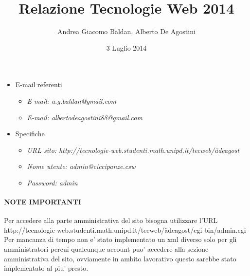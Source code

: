 \documentclass[a4paper, 12pt]{article}
\title{Relazione Tecnologie Web 2014}
\author{Andrea Giacomo Baldan, Alberto De Agostini}
\date{3 Luglio 2014}
\begin{document}
\maketitle

\begin{itemize}
\item E-mail referenti
  \begin{itemize}
  \item \emph{E-mail: a.g.baldan@gmail.com}
  \item \emph{E-mail: albertodeagostini88@gmail.com}
  \end{itemize}
\item Specifiche
  \begin{itemize}
  \item \emph{URL sito: http://tecnologie-web.studenti.math.unipd.it/tecweb/\~adeagost}
  \item \emph{Nome utente: admin@ciccipanze.csw}
  \item \emph{Password: admin}
  \end{itemize}
\end{itemize}

\paragraph{NOTE IMPORTANTI}
Per accedere alla parte amministrativa del sito bisogna utilizzare l'URL\newline
http://tecnologie-web.studenti.math.unipd.it/tecweb/\~adeagost/cgi-bin/admin.cgi\newline
Per mancanza di tempo non e' stato implementato un xml diverso solo per gli amministratori percui qualcunque account puo' accedere alla sezione amministrativa del sito, ovviamente in ambito lavorativo questo sarebbe stato implementato al piu' presto.







\end{document}

